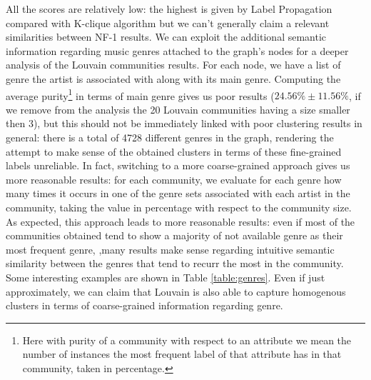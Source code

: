 \documentclass[sigchi]{acmart}
\begin{document}
All the scores are relatively low: the highest is given by Label Propagation compared with K-clique algorithm but we can't generally claim a relevant similarities between NF-1 results. 
We can exploit the additional semantic information regarding music genres attached to the graph's nodes for a deeper analysis of the Louvain communities results. For each node, we have a list of genre the artist is associated with along with its main genre. Computing the average purity\footnote{Here with purity of a community with respect to an attribute we mean the number of instances the most frequent label of that attribute has in that community, taken in percentage.} in terms of main genre gives us poor results ($24.56\%\pm11.56\%$, if we remove from the analysis the 20 Louvain communities having a size smaller then 3), but this should not be immediately linked with poor clustering results in general: there is a total of 4728 different genres in the graph, rendering the attempt to make sense of the obtained clusters in terms of these fine-grained labels unreliable. In fact, switching to a more coarse-grained approach gives us more reasonable results: for each community, we evaluate for each genre how many times it occurs in one of the genre sets associated with each artist in the community, taking the value in percentage with respect to the community size. As expected, this approach leads to more reasonable results: even if most of the communities obtained tend to show a majority of not available genre as their most frequent genre, ,many results make sense regarding intuitive semantic similarity between the genres that tend to recurr the most in the community. Some interesting examples are shown in Table \ref{table:genres}. Even if just approximately, we can claim that Louvain is also able to capture homogenous clusters in terms of coarse-grained information regarding genre.
\end{document}
